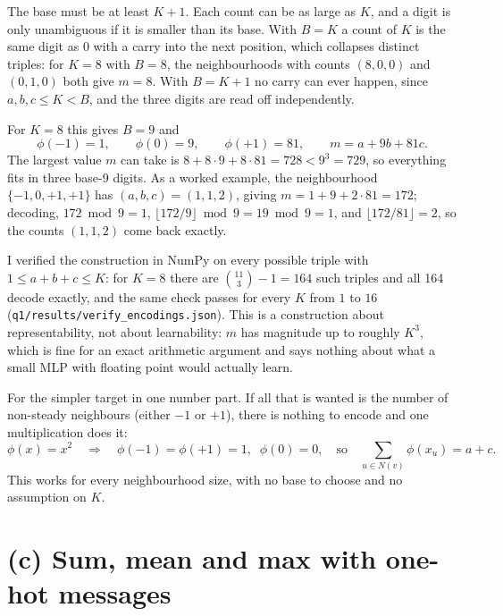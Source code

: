 \documentclass[11pt,letterpaper]{article}
\begin{document}
{The base must be at least $K + 1$.} Each count can be as large as $K$, and a digit is
only unambiguous if it is smaller than its base. With $B = K$ a count of $K$ is the
same digit as $0$ with a carry into the next position, which collapses distinct triples: for
$K = 8$ with $B = 8$, the neighbourhoods with counts $(8, 0, 0)$ and $(0, 1, 0)$ both give
$m = 8$. With $B = K + 1$ no carry can ever happen, since $a, b, c \le K < B$, and the three
digits are read off independently.

For $K = 8$ this gives $B = 9$ and
\begin{equation*}
\phi(-1) = 1, \qquad \phi(0) = 9, \qquad \phi(+1) = 81, \qquad
m = a + 9 b + 81 c .
\end{equation*}
The largest value $m$ can take is $8 + 8 \cdot 9 + 8 \cdot 81 = 728 < 9^3 = 729$, so everything
fits in three base-9 digits. As a worked example, the neighbourhood $\{-1, 0, +1, +1\}$ has
$(a, b, c) = (1, 1, 2)$, giving $m = 1 + 9 + 2 \cdot 81 = 172$; decoding, $172 \bmod 9 = 1$,
$\lfloor 172 / 9 \rfloor \bmod 9 = 19 \bmod 9 = 1$, and $\lfloor 172 / 81 \rfloor = 2$, so the
counts $(1, 1, 2)$ come back exactly.

I verified the construction in NumPy on every possible triple with $1 \le a + b + c \le K$:
for $K = 8$ there are $\binom{11}{3} - 1 = 164$ such triples and all 164 decode exactly, and
the same check passes for every $K$ from $1$ to $16$ (\texttt{q1/results/verify\_encodings.json}). This is a construction about representability, not
about learnability: $m$ has magnitude up to roughly $K^3$, which is fine for an exact
arithmetic argument and says nothing about what a small MLP with floating point would
actually learn.

For the simpler target in one number part. If all that is wanted is the number of non-steady
neighbours (either $-1$ or $+1$), there is nothing to encode and one multiplication does it:
\begin{equation*}
\phi(x) = x^2 \quad\Longrightarrow\quad
\phi(-1) = \phi(+1) = 1, \;\; \phi(0) = 0, \quad\text{so}\quad
\sum_{u \in N(v)} \phi(x_u) = a + c .
\end{equation*}
This works for every neighbourhood size, with no base to choose and no assumption on $K$.

\section*{(c) Sum, mean and max with one-hot messages}
\end{document}
